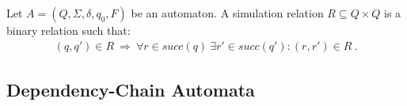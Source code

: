 \documentclass[envcountsame]{llncs}%
\begin{document}
\begin{definition}
  
\end{definition}

\begin{definition}
  Let $A=(Q,\Sigma,\delta,q_0,F)$ be an automaton.
  A simulation relation $R\subseteq Q\times Q$ is a binary relation
  such that:
\begin{align*}
  (q,q')\in R \ \Longrightarrow \ \forall r\in succ(q)\ \exists r'\in succ(q'): (r,r')\in R \ .
\end{align*}
\end{definition}

\subsection{Dependency-Chain Automata}
\end{document}
